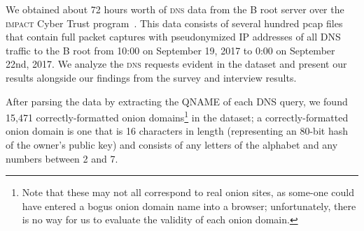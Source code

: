 We obtained about 72 hours worth of \textsc{dns} data from the B root server
over the \textsc{impact} Cyber Trust program~\cite{b_root}.  This data consists
of several hundred pcap files that contain full packet captures with
pseudonymized IP addresses of all DNS traffic to the B root from 10:00 on September 
19, 2017 to 0:00 on September 22nd, 2017.  We analyze the \textsc{dns} requests evident in the
dataset and present our results alongside our findings from the survey and
interview results.

After parsing the data by extracting the QNAME of each DNS query, we found 15,471 correctly-formatted onion domains\footnote{Note that these may
not all correspond to real onion sites, as some-one could have entered a bogus
onion domain name into a browser; unfortunately, there is no way for us to
evaluate the validity of each onion domain.} in the dataset; a correctly-formatted onion domain 
is one that is 16 characters in length (representing an 80-bit hash of the owner's public key) and 
consists of any letters of the alphabet and any numbers between 2 and 7.
